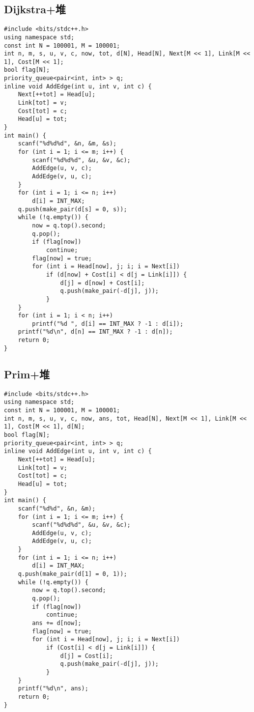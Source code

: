\documentclass[a4paper]{article}
\begin{document}
\subsection{Dijkstra+堆}
\begin{lstlisting}
#include <bits/stdc++.h>
using namespace std;
const int N = 100001, M = 100001;
int n, m, s, u, v, c, now, tot, d[N], Head[N], Next[M << 1], Link[M << 1], Cost[M << 1];
bool flag[N];
priority_queue<pair<int, int> > q;
inline void AddEdge(int u, int v, int c) {
    Next[++tot] = Head[u];
    Link[tot] = v;
    Cost[tot] = c;
    Head[u] = tot;
}
int main() {
    scanf("%d%d%d", &n, &m, &s);
    for (int i = 1; i <= m; i++) {
        scanf("%d%d%d", &u, &v, &c);
        AddEdge(u, v, c);
        AddEdge(v, u, c);
    }
    for (int i = 1; i <= n; i++)
        d[i] = INT_MAX;
    q.push(make_pair(d[s] = 0, s));
    while (!q.empty()) {
        now = q.top().second;
        q.pop();
        if (flag[now])
            continue;
        flag[now] = true;
        for (int i = Head[now], j; i; i = Next[i])
            if (d[now] + Cost[i] < d[j = Link[i]]) {
                d[j] = d[now] + Cost[i];
                q.push(make_pair(-d[j], j));
            }
    }
    for (int i = 1; i < n; i++)
        printf("%d ", d[i] == INT_MAX ? -1 : d[i]);
    printf("%d\n", d[n] == INT_MAX ? -1 : d[n]);
    return 0;
}
\end{lstlisting}
\subsection{Prim+堆}
\begin{lstlisting}
#include <bits/stdc++.h>
using namespace std;
const int N = 100001, M = 100001;
int n, m, s, u, v, c, now, ans, tot, Head[N], Next[M << 1], Link[M << 1], Cost[M << 1], d[N];
bool flag[N];
priority_queue<pair<int, int> > q;
inline void AddEdge(int u, int v, int c) {
    Next[++tot] = Head[u];
    Link[tot] = v;
    Cost[tot] = c;
    Head[u] = tot;
}
int main() {
    scanf("%d%d", &n, &m);
    for (int i = 1; i <= m; i++) {
        scanf("%d%d%d", &u, &v, &c);
        AddEdge(u, v, c);
        AddEdge(v, u, c);
    }
    for (int i = 1; i <= n; i++)
        d[i] = INT_MAX;
    q.push(make_pair(d[1] = 0, 1));
    while (!q.empty()) {
        now = q.top().second;
        q.pop();
        if (flag[now])
            continue;
        ans += d[now];
        flag[now] = true;
        for (int i = Head[now], j; i; i = Next[i])
            if (Cost[i] < d[j = Link[i]]) {
                d[j] = Cost[i];
                q.push(make_pair(-d[j], j));
            }
    }
    printf("%d\n", ans);
    return 0;
}
\end{lstlisting}
\end{document}
